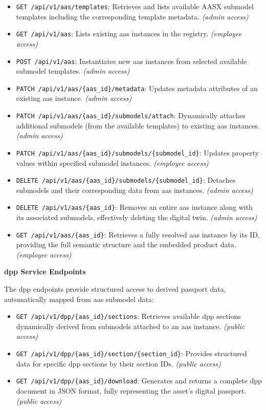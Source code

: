\begin{itemize}[itemsep=0.5\baselineskip]
    \item \verb|GET /api/v1/aas/templates|: Retrieves and lists available AASX submodel templates including the corresponding template metadata. \textit{(admin access)}
    \item \verb|GET /api/v1/aas|: Lists existing \ac{aas} instances in the registry. \textit{(employee access)}
    \item \verb|POST /api/v1/aas|: Instantiates new \ac{aas} instances from selected available submodel templates. \textit{(admin access)}
    \item \verb|PATCH /api/v1/aas/{aas_id}/metadata|: Updates metadata attributes of an existing \ac{aas} instance. \textit{(admin access)}
    \item \verb|PATCH /api/v1/aas/{aas_id}/submodels/attach|: Dynamically attaches additional submodels (from the available templates) to existing \ac{aas} instances. \textit{(admin access)}
    \item \verb|PATCH /api/v1/aas/{aas_id}/submodels/{submodel_id}|: Updates property values within specified submodel instances. \textit{(employee access)}
    \item \verb|DELETE /api/v1/aas/{aas_id}/submodels/{submodel_id}|: Detaches submodels and their corresponding data from \ac{aas} instances. \textit{(admin access)}
    \item \verb|DELETE /api/v1/aas/{aas_id}|: Removes an entire \ac{aas} instance along with its associated submodels, effectively deleting the digital twin. \textit{(admin access)}
    \item \verb|GET /api/v1/aas/{aas_id}|: Retrieves a fully resolved \ac{aas} instance by its ID, providing the full semantic structure and the embedded product data. \textit{(employee access)}
\end{itemize}

\textbf{\ac{dpp} Service Endpoints}

The \ac{dpp} endpoints provide structured access to derived passport data, automatically mapped from \ac{aas} submodel data:

\begin{itemize}[itemsep=0.5\baselineskip]
    \item \verb|GET /api/v1/dpp/{aas_id}/sections|: Retrieves available \ac{dpp} sections dynamically derived from submodels attached to an \ac{aas} instance. \textit{(public access)}
    \item \verb|GET /api/v1/dpp/{aas_id}/section/{section_id}|: Provides structured data for specific \ac{dpp} sections by their section IDs. \textit{(public access)}
    \item \verb|GET /api/v1/dpp/{aas_id}/download|: Generates and returns a complete \ac{dpp} document in JSON format, fully representing the asset's digital passport. \textit{(public access)}
\end{itemize}

